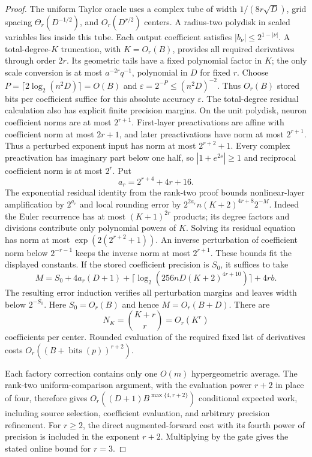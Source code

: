\begin{proof}
The uniform Taylor oracle uses a complex tube of width
$1/(8r\sqrt D)$, grid spacing $\Theta_r(D^{-1/2})$, and
$O_r(D^{r/2})$ centers. A radius-two polydisk in scaled variables
lies inside this tube. Each output coefficient satisfies
$|b_\nu|\le2^{1-|\nu|}$. A total-degree-$K$ truncation, with
$K=O_r(B)$, provides all required derivatives through order $2r$.
Its geometric tails have a fixed polynomial factor in $K$; the
only scale conversion is at most $a^{-2r}q^{-1}$, polynomial in
$D$ for fixed $r$. Choose
$P=\lceil2\log_2(n^2D)\rceil=O(B)$ and
$\varepsilon=2^{-P}\le(n^2D)^{-2}$.
Thus $O_r(B)$ stored bits per coefficient suffice for this
absolute accuracy $\varepsilon$.
The total-degree residual calculation also has explicit finite
precision margins. On the unit polydisk, neuron coefficient norms
are at most $2^{r+1}$. First-layer preactivations are affine with
coefficient norm at most $2r+1$, and later preactivations have norm
at most $2^{r+1}$. Thus a perturbed exponent input has norm at most
$2^{r+2}+1$. Every complex preactivation has imaginary part below
one half, so $|1+e^{2s}|\ge1$ and reciprocal coefficient norm is
at most $2^r$. Put
\[
 a_r=2^{r+4}+4r+16.
\]
The exponential residual identity from the rank-two proof bounds
nonlinear-layer amplification by $2^{a_r}$ and local rounding error
by $2^{2a_r}n(K+2)^{4r+8}2^{-M}$. Indeed the Euler recurrence has
at most $(K+1)^{2r}$ products; its degree factors and divisions
contribute only polynomial powers of $K$. Solving its residual
equation has norm at most $\exp(2(2^{r+2}+1))$. An inverse
perturbation of coefficient norm below $2^{-r-1}$ keeps the inverse
norm at most $2^{r+1}$. These bounds fit the displayed constants.
If the stored coefficient precision is $S_0$, it suffices to take
\[
 M=S_0+4a_r(D+1)+
 \lceil\log_2(256nD(K+2)^{4r+10})\rceil+4rb.
\]
The resulting error induction verifies all perturbation margins
and leaves width below $2^{-S_0}$. Here
$S_0=O_r(B)$ and hence $M=O_r(B+D)$. There are
\[
 N_K=\binom{K+r}{r}=O_r(K^r)
\]
coefficients per center. Rounded evaluation of the required fixed
list of derivatives costs $O_r((B+\operatorname{bits}(p))^{r+2})$.

Each factory correction contains only one $O(m)$ hypergeometric
average. The rank-two uniform-comparison argument, with the evaluation
power $r+2$ in place of four, therefore gives
$O_r((D+1)B^{\max\{4,r+2\}})$ conditional expected work, including source
selection, coefficient evaluation, and arbitrary precision
refinement. For $r\ge2$, the direct augmented-forward cost with its fourth
power of precision is included in the exponent $r+2$.
Multiplying by the gate gives the stated online bound for $r=3$.


\end{proof}
